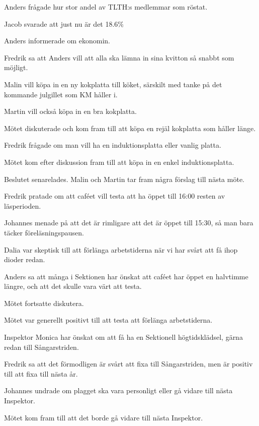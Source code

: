 \documentclass[10pt]{article}
\begin{document}
\begin{paragrafer}
\begin{paragrafer}
Anders frågade hur stor andel av TLTH:s medlemmar som röstat.

Jacob svarade att just nu är det 18.6\%

Anders informerade om ekonomin.

Fredrik sa att Anders vill att alla ska lämna in sina kvitton så snabbt som möjligt.

\end{paragrafer}

Malin vill köpa in en ny kokplatta till köket, särskilt med tanke på det kommande julgillet som KM håller i.

Martin vill också köpa in en bra kokplatta.

Mötet diskuterade och kom fram till att köpa en rejäl kokplatta som håller länge.

Fredrik frågade om man vill ha en induktionsplatta eller vanlig platta.

Mötet kom efter diskussion fram till att köpa in en enkel induktionsplatta.

Beslutet senarelades. Malin och Martin tar fram några förslag till nästa möte.

Fredrik pratade om att caféet vill testa att ha öppet till 16:00 resten av läsperioden.

Johannes menade på att det är rimligare att det är öppet till 15:30, så man bara täcker föreläsningspausen.

Dalia var skeptisk till att förlänga arbetstiderna när vi har svårt att få ihop dioder redan.

Anders sa att många i Sektionen har önskat att caféet har öppet en halvtimme längre, och att det skulle vara värt att testa.

Mötet fortsatte diskutera.

Mötet var generellt positivt till att testa att förlänga arbetstiderna.

Inspektor Monica har önskat om att få ha en Sektionell högtidsklädsel, gärna redan till Sångarstriden.

Fredrik sa att det förmodligen är svårt att fixa till Sångarstriden, men är positiv till att fixa till nästa år.

Johannes undrade om plagget ska vara personligt eller gå vidare till nästa Inspektor.

Mötet kom fram till att det borde gå vidare till nästa Inspektor.


\end{paragrafer}
\end{document}
